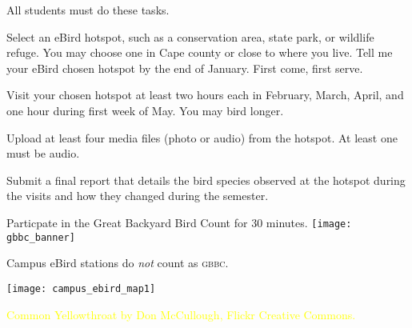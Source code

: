 \documentclass[t]{beamer}
\begin{document}
{
\begin{frame}{All  students must do these tasks.}

\vspace{-\baselineskip}

\hangpara Select an eBird hotspot, such as a conservation area, state park, or wildlife refuge. You may choose one in Cape county or close to where you live. Tell me your eBird chosen hotspot by the end of January. First come, first serve.

\hangpara Visit your chosen hotspot at least two hours each in February, March, April, and one hour during first week of May. You may bird longer.

\hangpara \href{https://support.ebird.org/en/support/solutions/articles/48000795623-ebird-rules-and-best-practices}{} 


\hangpara Upload at least four media files (photo or audio) from the hotspot. At least one must be audio.

\hangpara Submit a final report that details the bird species observed at the hotspot during the visits and how they changed during the semester. 

\end{frame}
}

\begin{frame}{Particpate in the Great Backyard Bird Count for 30 minutes.}
	\texttt{[image: gbbc\_banner]}
	
	 \hfill Campus eBird stations do \emph{not} count as \textsc{gbbc.}
	
\end{frame}

\begin{frame}
	\centering
	\texttt{[image: campus\_ebird\_map1]}
\end{frame}

\begin{frame}
	\centering
\end{frame}


{
\begin{frame}[b,plain]
	\tiny\textcolor{yellow}{Common Yellowthroat by Don McCullough, Flickr Creative Commons.}
\end{frame}
}
\end{document}
